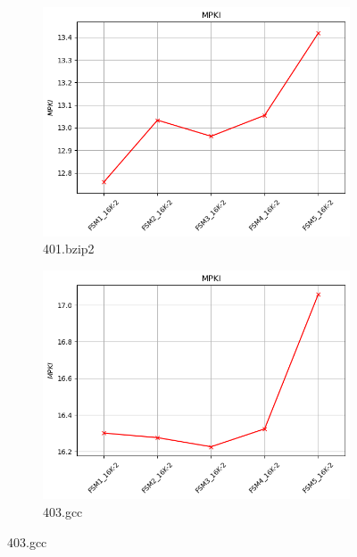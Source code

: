 \documentclass{article}
\begin{document}
 \begin{figure}[H]
     \centering
 
     \begin{subfigure}[b]{0.45\textwidth}
         \includegraphics[width=\textwidth]{figures/5_3_b/401.bzip2.cslab_branch_preds_ref.out.png}
         \caption{401.bzip2}
         \label{fig:plot17}
     \end{subfigure}
     \hfill
     \begin{subfigure}[b]{0.45\textwidth}
         \includegraphics[width=\textwidth]{figures/5_3_b/403.gcc.cslab_branch_preds_ref.out.png}
         \caption{403.gcc}
         \label{fig:plot18}
     \end{subfigure}
 

\end{figure}
\end{document}
